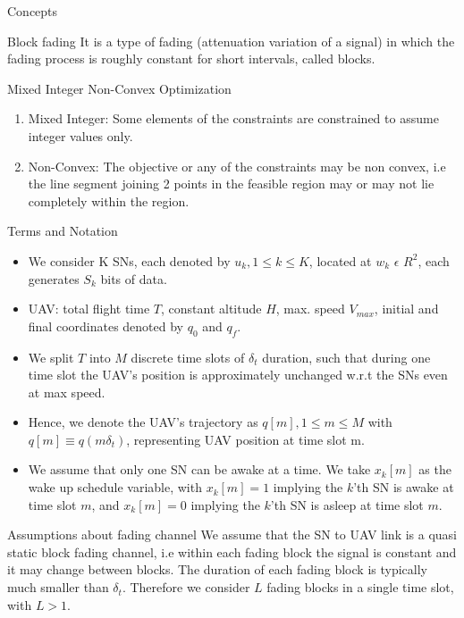 \documentclass{beamer}
\begin{document}
\begin{frame}{Concepts}
    \begin{block}{Block fading}
    It is a type of fading (attenuation variation of a signal) in which the fading process is roughly constant for short intervals, called blocks.
    
    \end{block}
    \begin{block}{Mixed Integer Non-Convex Optimization}
    \begin{enumerate}
        \item Mixed Integer: Some elements of the constraints are constrained to assume integer values only.
        \item Non-Convex: The objective or any of the constraints may be non convex, i.e the line segment joining 2 points in the feasible region may or may not lie completely within the region. 
    \end{enumerate}
    \end{block}
\end{frame}
\begin{frame}{Terms and Notation}
\begin{itemize}
    \item We consider K SNs, each denoted by $u_k, 1 \leq k \leq K$, located at $w_k$  $\epsilon$  $R^2$, each generates $S_k$ bits of data.
    \item UAV: total flight time $T$, constant altitude $H$, max. speed $V_{max}$, initial and final coordinates denoted by $q_0$ and $q_f$. 
    \item We split $T$ into $M$ discrete time slots of $\delta_t$ duration, such that during one time slot the UAV's position is approximately unchanged w.r.t the SNs even at max speed. 
    \item Hence, we denote the UAV's trajectory as $q[m], 1 \leq m \leq M$ with $q[m]\equiv q(m \delta_t)$, representing UAV position at time slot m.
    \item We assume that only one SN can be awake at a time. We take $x_k[m]$ as the wake up schedule variable, with $x_k[m]=1$ implying the $k$'th SN is awake at time slot $m$, and $x_k[m]=0$ implying the $k$'th SN is asleep at time slot $m$.
\end{itemize}
\end{frame}
\begin{frame}{Assumptions about fading channel}
 We assume that the SN to UAV link is a quasi static block fading channel, i.e within each fading block the signal is constant and it may change between blocks. 
 The duration of each fading block is typically much smaller than $\delta_t$. Therefore we consider $L$ fading blocks in a single time slot, with $L>1$.
\end{frame}
\end{document}
